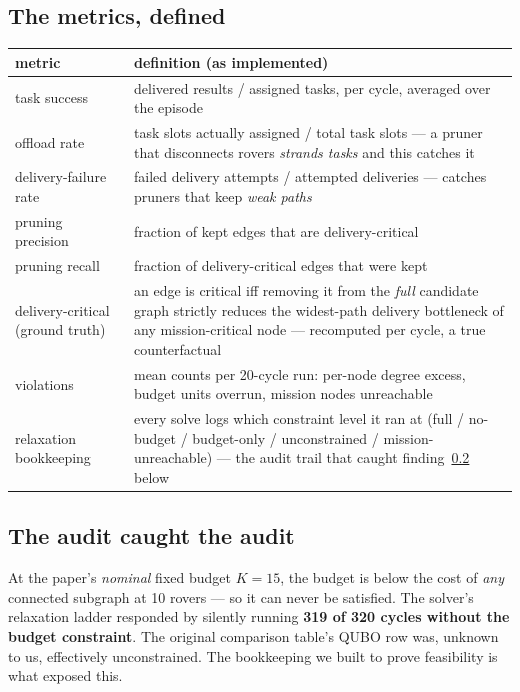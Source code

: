 \documentclass[11pt]{article}
\newenvironment{goldcard}{%
  \def\FrameCommand{\fboxsep=8pt\fcolorbox{goldline}{goldbg}}%
  \MakeFramed{\advance\hsize-\width\FrameRestore}\noindent}{\endMakeFramed}
\newcommand{\key}[1]{\textcolor{quboc}{\textbf{#1}}}
\begin{document}
\subsection{The metrics, defined}

\begin{center}
\small
\begin{tabular}{p{3.4cm}p{11.6cm}}
\toprule
metric & definition (as implemented) \\
\midrule
task success & delivered results / assigned tasks, per cycle, averaged over
the episode \\
offload rate & task slots actually assigned / total task slots --- a pruner
that disconnects rovers \emph{strands tasks} and this catches it \\
delivery-failure rate & failed delivery attempts / attempted deliveries ---
catches pruners that keep \emph{weak paths} \\
pruning precision & fraction of kept edges that are delivery-critical \\
pruning recall & fraction of delivery-critical edges that were kept \\
delivery-critical (ground truth) & an edge is critical iff removing it from
the \emph{full} candidate graph strictly reduces the widest-path delivery
bottleneck of any mission-critical node --- recomputed per cycle, a true
counterfactual \\
violations & mean counts per 20-cycle run: per-node degree excess, budget
units overrun, mission nodes unreachable \\
relaxation bookkeeping & every solve logs which constraint level it ran at
(full / no-budget / budget-only / unconstrained / mission-unreachable) ---
the audit trail that caught finding~\ref{find:audit} below \\
\bottomrule
\end{tabular}
\end{center}

\subsection{The audit caught the audit}
\label{find:audit}

\begin{goldcard}
At the paper's \emph{nominal} fixed budget $K{=}15$, the budget is below
the cost of \emph{any} connected subgraph at 10 rovers --- so it can never
be satisfied. The solver's relaxation ladder responded by silently running
\key{319 of 320 cycles without the budget constraint}. The original
comparison table's QUBO row was, unknown to us, effectively unconstrained.
The bookkeeping we built to prove feasibility is what exposed this.
\end{goldcard}
\end{document}
